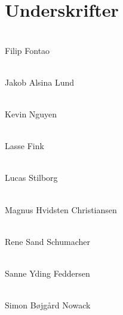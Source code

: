 \documentclass[a4paper,12pt]{article}
\begin{document}
\section*{Underskrifter}

\vspace{1cm}

\noindent\makebox[\textwidth]{\hrulefill}\\
Filip Fontao

\vspace{1cm}

\noindent\makebox[\textwidth]{\hrulefill}\\
Jakob Alsina Lund

\vspace{1cm}

\noindent\makebox[\textwidth]{\hrulefill}\\
Kevin Nguyen

\vspace{1cm}

\noindent\makebox[\textwidth]{\hrulefill}\\
Lasse Fink

\vspace{1cm}

\noindent\makebox[\textwidth]{\hrulefill}\\
Lucas Stilborg

\vspace{1cm}

\noindent\makebox[\textwidth]{\hrulefill}\\
Magnus Hvidsten Christiansen

\vspace{1cm}

\noindent\makebox[\textwidth]{\hrulefill}\\
Rene Sand Schumacher

\vspace{1cm}

\noindent\makebox[\textwidth]{\hrulefill}\\
Sanne Yding Feddersen

\vspace{1cm}

\noindent\makebox[\textwidth]{\hrulefill}\\
Simon Bøjgård Nowack
\end{document}
